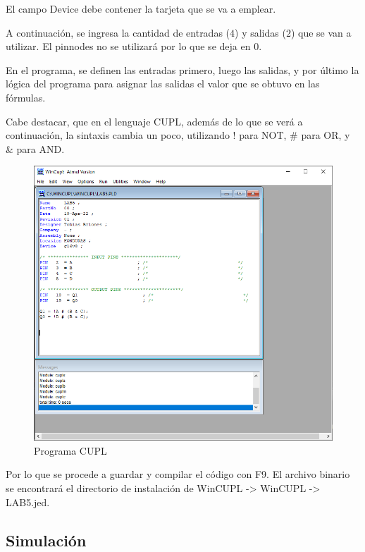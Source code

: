 \documentclass{article}
\begin{document}
    El campo Device debe contener la tarjeta que se va a emplear.

    \bigbreak

    A continuación, se ingresa la cantidad de entradas ($4$) y salidas ($2$)
    que se van a utilizar. El pinnodes no se utilizará por lo que se deja en
    $0$.

    \bigbreak

    En el programa, se definen las entradas primero, luego las salidas, y por
    último la lógica del programa para asignar las salidas el valor que se
    obtuvo en las fórmulas.

    \bigbreak

    Cabe destacar, que en el lenguaje CUPL, además de lo que se verá a
    continuación, la sintaxis cambia un poco, utilizando ! para NOT, \# para
    OR, y \& para AND.

    \begin{figure}[H]
        \centering
        \includegraphics[width=0.5\paperwidth]{images/wincupl-program}
        \caption{Programa CUPL}
    \end{figure}

    Por lo que se procede a guardar y compilar el código con F9. El archivo
    binario se encontrará el directorio de instalación de WinCUPL -> WinCUPL
    -> LAB5.jed.

    \subsection{Simulación}
\end{document}
